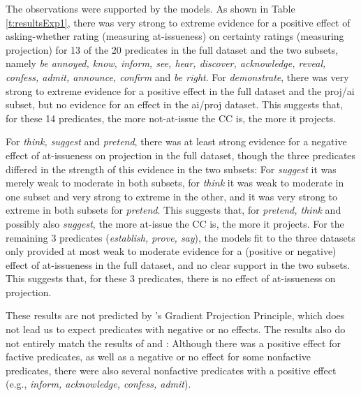 \documentclass[11pt,fleqn]{article}
\newcommand{\6}{\mbox{$[\hspace*{-.6mm}[$}}
\newcommand{\9}{\mbox{$]\hspace*{-.6mm}]$}}
\newcommand{\citepos}[1]{\citeauthor{#1}'s \citeyear{#1}}
\begin{document}
The observations were supported by the models. As shown in Table \ref{t:resultsExp1}, there was very strong to extreme evidence for a positive effect of asking-whether rating (measuring at-issueness) on certainty ratings (measuring projection) for 13 of the 20 predicates in the full dataset and the two subsets, namely {\em be annoyed, know, inform, see, hear, discover, acknowledge, reveal, confess, admit, announce, confirm} and {\em be right}. For {\em demonstrate}, there was very strong to extreme evidence for a positive effect in the full dataset and the proj/ai subset, but no evidence for an effect in the ai/proj dataset. This suggests that, for these 14 predicates, the more not-at-issue the CC is, the more it projects. 

For {\em think, suggest} and {\em pretend}, there was at least strong evidence for a negative effect of at-issueness on projection in the full dataset, though the three predicates differed in the strength of this evidence in the two subsets: For {\em suggest} it was merely weak to moderate in both subsets, for {\em think} it was weak to moderate in one subset and very strong to extreme in the other, and it was very strong to extreme in both subsets for {\em pretend}. This suggests that, for {\em pretend, think} and possibly also {\em suggest}, the more at-issue the CC is, the more it projects. For the remaining 3 predicates ({\em establish, prove, say}), the models fit to the three datasets only provided at most weak to moderate evidence for a (positive or negative) effect of at-issueness in the full dataset, and no clear support in the two subsets. This suggests that, for these 3 predicates, there is no effect of at-issueness on projection.

These results are not predicted by \citepos{tbd-variability} Gradient Projection Principle, which does not lead us to expect predicates with negative or no effects. The results also do not entirely match the results of \citealt{djaerv-bacovcin-salt27,djaerv-bacovcin2020} and  \citealt{mahler-etal2020}: Although there was a positive effect for factive predicates, as well as a negative or no effect for some nonfactive predicates, there were also several nonfactive predicates with a positive effect (e.g., {\em inform, acknowledge, confess, admit}). 
\end{document}
